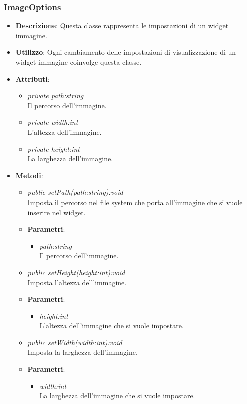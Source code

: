 \subsubsection{ImageOptions}
\begin{itemize}
\item \textbf{Descrizione}: Questa classe rappresenta le impostazioni di un widget immagine.
\item \textbf{Utilizzo}: Ogni cambiamento delle impostazioni di visualizzazione di un widget immagine coinvolge questa classe.
\item \textbf{Attributi}:
	\begin{itemize}
	\item \textit{private path:string}\\
	Il percorso dell'immagine.
	\item \textit{private width:int}\\
	L'altezza dell'immagine. 
	\item \textit{private height:int}\\
	La larghezza dell'immagine. 
	\end{itemize}
\item \textbf{Metodi}:
	\begin{itemize}
	\item \textit{public setPath(path:string):void}\\
	Imposta il percorso nel file system che porta all'immagine che si vuole inserire nel widget.
		\item{\textbf{Parametri}: \begin{itemize}
		\item \textit{path:string}\\
		Il percorso dell'immagine.
		\end{itemize}}
	\item \textit{public setHeight(height:int):void}\\
	Imposta l'altezza dell'immagine.
		\item{\textbf{Parametri}: \begin{itemize}
		\item \textit{height:int}\\
		L'altezza dell'immagine che si vuole impostare.
		\end{itemize}}
	\item \textit{public setWidth(width:int):void}\\
	Imposta la larghezza dell'immagine.
		\item{\textbf{Parametri}: \begin{itemize}
		\item \textit{width:int}\\
		La larghezza dell'immagine che si vuole impostare.
		\end{itemize}}
	\end{itemize}
\end{itemize}